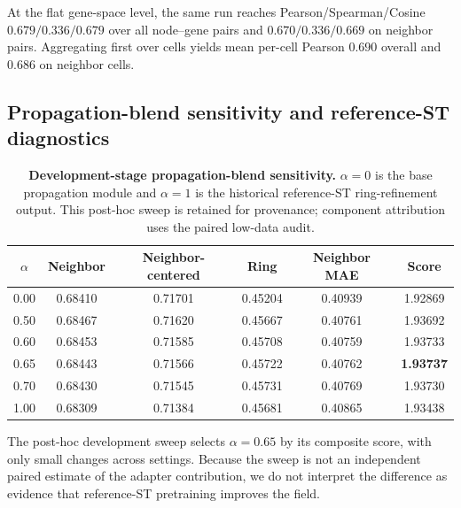 \documentclass[sigconf,review,balance=false]{acmart}
\begin{document}
At the flat gene-space level, the same run reaches Pearson/Spearman/Cosine $0.679/0.336/0.679$ over all node--gene pairs and $0.670/0.336/0.669$ on neighbor pairs. Aggregating first over cells yields mean per-cell Pearson $0.690$ overall and $0.686$ on neighbor cells.

\subsection{Propagation-blend sensitivity and reference-ST diagnostics}
\label{app:blend_and_reference_diagnostics}

\begin{table}[t]
\centering
\caption{\textbf{Development-stage propagation-blend sensitivity.}
$\alpha=0$ is the base propagation module and $\alpha=1$ is the historical
reference-ST ring-refinement output. This post-hoc sweep is retained for
provenance; component attribution uses the paired low-data audit.}
\label{tab:app_blend_sweep}
\small
\setlength{\tabcolsep}{5pt}
\renewcommand{\arraystretch}{1.10}
\begin{tabular}{cccccc}
\toprule
$\alpha$ & Neighbor & Neighbor-centered & Ring & Neighbor MAE & Score \\
\midrule
0.00 & 0.68410 & 0.71701 & 0.45204 & 0.40939 & 1.92869 \\
0.50 & 0.68467 & 0.71620 & 0.45667 & 0.40761 & 1.93692 \\
0.60 & 0.68453 & 0.71585 & 0.45708 & 0.40759 & 1.93733 \\
0.65 & 0.68443 & 0.71566 & 0.45722 & 0.40762 & \textbf{1.93737} \\
0.70 & 0.68430 & 0.71545 & 0.45731 & 0.40769 & 1.93730 \\
1.00 & 0.68309 & 0.71384 & 0.45681 & 0.40865 & 1.93438 \\
\bottomrule
\end{tabular}
\end{table}

The post-hoc development sweep selects $\alpha=0.65$ by its composite score,
with only small changes across settings. Because the sweep is not an
independent paired estimate of the adapter contribution, we do not interpret
the difference as evidence that reference-ST pretraining improves the field.
\end{document}

